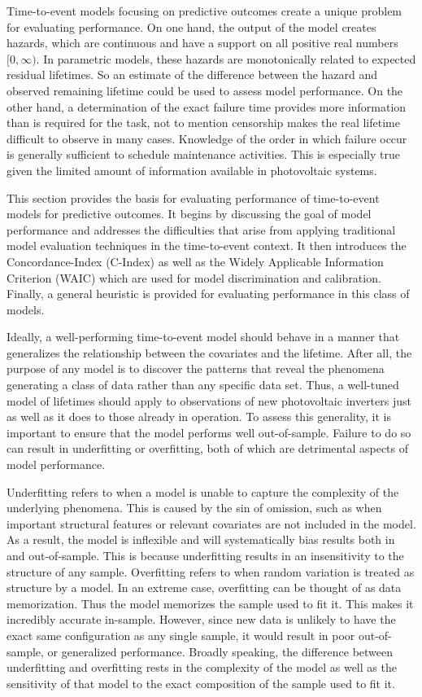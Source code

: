 Time-to-event models focusing on predictive outcomes create a unique problem for evaluating performance. On one hand, the output of the model creates hazards, which are continuous and have a support on all positive real numbers $[0, \infty)$. In parametric models, these hazards are monotonically related to expected residual lifetimes. So an estimate of the difference between the hazard and observed remaining lifetime could be used to assess model performance. On the other hand, a determination of the exact failure time provides more information than is required for the task, not to mention censorship makes the real lifetime difficult to observe in many cases. Knowledge of the order in which failure occur is generally sufficient to schedule maintenance activities. This is especially true given the limited amount of information available in photovoltaic systems. 

This section provides the basis for evaluating performance of time-to-event models for predictive outcomes. It begins by discussing the goal of model performance and addresses the difficulties that arise from applying traditional model evaluation techniques in the time-to-event context. It then introduces the Concordance-Index (C-Index) as well as the Widely Applicable Information Criterion (WAIC) which are used for model discrimination and calibration. Finally, a general heuristic is provided for evaluating performance in this class of models.

Ideally, a well-performing time-to-event model should behave in a manner that generalizes the relationship between the covariates and the lifetime. After all, the purpose of any model is to discover the patterns that reveal the phenomena generating a class of data rather than any specific data set. Thus, a well-tuned model of lifetimes should apply to observations of new photovoltaic inverters just as well as it does to those already in operation. To assess this generality, it is important to ensure that the model performs well out-of-sample. Failure to do so can result in underfitting or overfitting, both of which are detrimental aspects of model performance. 

Underfitting refers to when a model is unable to capture the complexity of the underlying phenomena. This is caused by the sin of omission, such as when important structural features or relevant covariates are not included in the model. As a result, the model is inflexible and will systematically bias results both in and out-of-sample. This is because underfitting results in an insensitivity to the structure of any sample. Overfitting refers to when random variation is treated as structure by a model. In an extreme case, overfitting can be thought of as data memorization. Thus the model memorizes the sample used to fit it. This makes it incredibly accurate in-sample. However, since new data is unlikely to have the exact same configuration as any single sample, it would result in poor out-of-sample, or generalized performance. Broadly speaking, the difference between underfitting and overfitting rests in the complexity of the model as well as the sensitivity of that model to the exact composition of the sample used to fit it\cite{McElreath2016}. 

